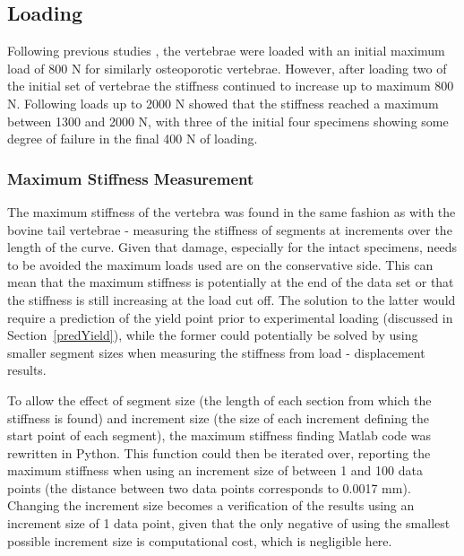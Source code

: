 \subsection{Loading}

Following previous studies \cite{Wijayathunga2008}, the vertebrae were loaded
with an initial maximum load of 800 N for similarly osteoporotic vertebrae.
However, after loading two of the initial set of vertebrae the stiffness
continued to increase up to maximum 800 N. Following loads up to 2000 N showed
that the stiffness reached a maximum between 1300 and 2000 N, with three of the
initial four specimens showing some degree of failure in the final 400 N of
loading.

\subsubsection{Maximum Stiffness Measurement}

The maximum stiffness of the vertebra was found in the same fashion as with the
bovine tail vertebrae - measuring the stiffness of segments at increments over
the length of the curve. Given that damage, especially for the intact
specimens,
needs to be avoided the maximum loads used are on the conservative side. This
can mean that the maximum stiffness is potentially at the end of the data set
or
that the stiffness is still increasing at the load cut off. The solution to the
latter would require a prediction of the yield point prior to experimental
loading (discussed in Section~\ref{predYield}), while the former could
potentially be solved by using smaller segment sizes when measuring the
stiffness from load - displacement results.

To allow the effect of segment size (the length of each section from which the
stiffness is found) and increment size (the size of each increment defining the
start point of each segment), the maximum stiffness finding Matlab code was
rewritten in Python. This function could then be iterated over, reporting the
maximum stiffness when using an increment size of between 1 and 100 data points
(the distance between two data points corresponds to 0.0017 mm). Changing the
increment size becomes a verification of the results using an increment size of
1 data point, given that the only negative of using the smallest possible
increment size is computational cost, which is negligible here.


